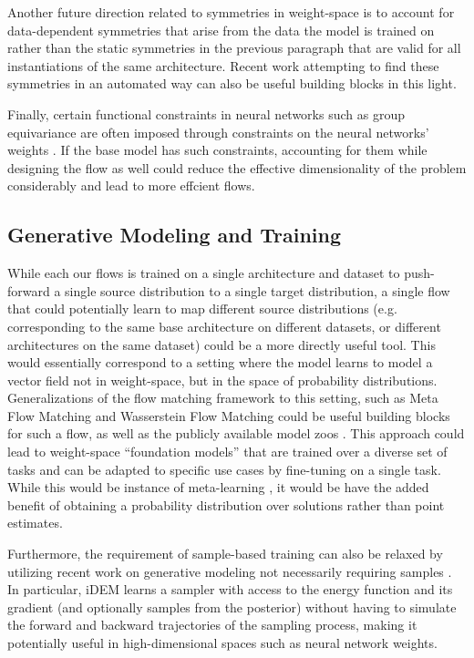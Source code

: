 Another future direction related to symmetries in weight-space is to account for data-dependent symmetries \citep{zhaoSymmetriesFlatMinima2023} that arise from the data the model is trained on rather than the static symmetries in the previous paragraph that are valid for all instantiations of the same architecture. Recent work attempting to find these symmetries in an automated way \citep{zhaoFindingSymmetryNeural2024} can also be useful building blocks in this light. 

Finally, certain functional constraints in neural networks such as group equivariance are often imposed through constraints on the neural networks' weights \citep{weilerEquivariantCoordinateIndependent2023}. If the base model has such constraints, accounting for them while designing the flow as well could reduce the effective dimensionality of the problem considerably and lead to more effcient flows. 

\subsection{Generative Modeling and Training}

While each our flows is trained on a single architecture and dataset to push-forward a single source distribution to a single target distribution, a single flow that could potentially learn to map different source distributions (e.g. corresponding to the same base architecture on different datasets, or different architectures on the same dataset) could be a more directly useful tool. This would essentially correspond to a setting where the model learns to model a vector field not in weight-space, but in the space of probability distributions. Generalizations of the flow matching framework to this setting, such as Meta Flow Matching \citep{atanackovicMetaFlowMatching2024a} and Wasserstein Flow Matching \citep{havivWassersteinFlowMatching2024} could be useful building blocks for such a flow, as well as the publicly available model zoos \citep{schurholtModelZoosDataset2022}. This approach could lead to weight-space ``foundation models'' that are trained over a diverse set of tasks and can be adapted to specific use cases by fine-tuning on a single task. While this would be instance of meta-learning \citep{hospedalesMetaLearningNeuralNetworks2022}, it would be have the added benefit of obtaining a probability distribution over solutions rather than point estimates. 

Furthermore, the requirement of sample-based training can also be relaxed by utilizing recent work on generative modeling not necessarily requiring samples \citep{vargasTransportMeetsVariational2023,akhound-sadeghIteratedDenoisingEnergy2024}. In particular, iDEM \citep{akhound-sadeghIteratedDenoisingEnergy2024} learns a sampler with access to the energy function and its gradient (and optionally samples from the posterior) without having to simulate the forward and backward trajectories of the sampling process, making it potentially useful in high-dimensional spaces such as neural network weights. 


